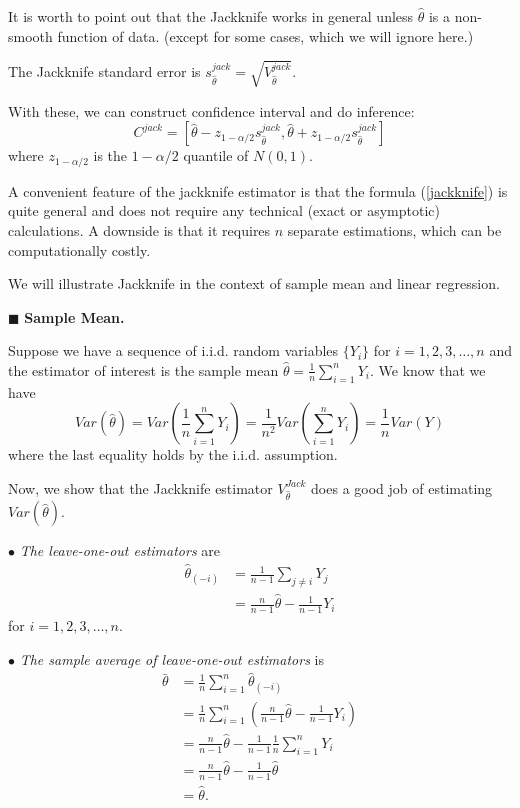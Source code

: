 \documentclass[11pt,a4paper]{amsart}
\theoremstyle{plain}
\theoremstyle{definition}
\begin{document}
	It is worth to point out that the Jackknife works in general unless $\hat{\theta}$ is a non-smooth function of data. (except for some cases, which we will ignore here.)\par 
	The Jackknife standard error is $s_{\hat{\theta}}^{jack} = \sqrt{V_{\hat{\theta}}^{jack}}$.\par 
	With these, we can construct confidence interval and do inference:
	\[	C^{j a c k}=\left[\hat{\theta}-z_{1-\alpha / 2} s_{\hat{\theta}}^{j a c k}, \hat{\theta}+z_{1-\alpha / 2} s_{\hat{\theta}}^{j a c k}\right]	\] 
	where $z_{1-\alpha / 2}$ is the $1-\alpha / 2$ quantile of $N(0,1)$.\par 
	A convenient feature of the jackknife estimator is that the formula (\ref{jackknife}) is quite general and does not require any technical (exact or asymptotic) calculations. A downside is that it requires $n$ separate estimations, which can be computationally costly.\par
	We will illustrate Jackknife in the context of sample mean and linear regression.\par 
	$\blacksquare$ \textbf{Sample Mean.}\par 
	Suppose we have a sequence of i.i.d. random variables $\{Y_{i}\}$ for $i = 1,2,3, \dots, n$ and the estimator of interest is the sample mean $\hat{\theta} = \frac{1}{n}\sum_{i=1}^{n}Y_{i}$. We know that we have 
	\[	Var(\hat{\theta}) = Var(\frac{1}{n}\sum_{i=1}^{n}Y_{i}) = \frac{1}{n^{2}}Var(\sum_{i=1}^{n}Y_{i}) = \frac{1}{n}Var(Y) 	\]
	where the last equality holds by the i.i.d. assumption.\par 
	Now, we show that the Jackknife estimator $V^{Jack}_{\hat{\theta}}$ does a good job of estimating $Var(\hat{\theta}) $. \par 
	$\bullet$ \emph{The leave-one-out estimators} are 
	\[	\begin{aligned}
	\hat{\theta}_{(-i)} &= \frac{1}{n-1}\sum_{j \ne i}Y_{j}\\
	&= \frac{n}{n-1}\hat{\theta} - \frac{1}{n-1}Y_{i}
	\end{aligned}	\]
	for $i = 1,2,3, \dots, n$.\par 
	$\bullet$\emph{ The sample average of leave-one-out estimators} is 
	\[	\begin{aligned}
	\bar{\theta} &= \frac{1}{n}\sum_{i=1}^{n}\hat{\theta}_{(-i)} \\
	&=  \frac{1}{n}\sum_{i=1}^{n} \left(\frac{n}{n-1}\hat{\theta} - \frac{1}{n-1}Y_{i}\right) \\
	&= \frac{n}{n-1}\hat{\theta} - \frac{1}{n-1}\frac{1}{n}\sum_{i=1}^{n}Y_{i}\\
	&=  \frac{n}{n-1}\hat{\theta} - \frac{1}{n-1}\hat{\theta}	\\
	&= \hat{\theta}.
	\end{aligned}	\]
	
\end{document}
